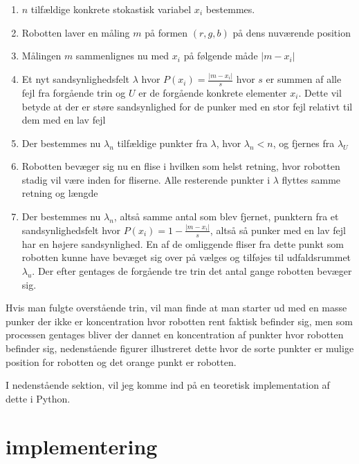 \documentclass[../../SRP.tex]{subfiles}
\begin{document}
\begin{enumerate}
  \item $n$ tilfældige konkrete stokastisk variabel $x_i$ bestemmes.

  \item Robotten laver en måling $m$ på formen $(r,g,b)$ på dens nuværende position

  \item Målingen $m$ sammenlignes nu med $x_i$ på følgende måde $|m - x_i|$

  \item Et nyt sandsynlighedsfelt $\lambda$ hvor $P(x_i) = \frac{|m - x_i|}{s}$ hvor $s$ er summen af alle fejl fra forgående trin og $U$ er de forgående konkrete elementer $x_i$. Dette vil betyde at der er støre sandsynlighed for de punker med en stor fejl relativt til dem med en lav fejl

  \item Der bestemmes nu $\lambda_n$ tilfældige punkter fra $\lambda$, hvor $ \lambda_n < n$, og fjernes fra $\lambda_U$

  \item Robotten bevæger sig nu en flise i hvilken som helst retning, hvor robotten stadig vil være inden for fliserne. Alle resterende punkter i $\lambda$ flyttes samme retning og længde 

  \item Der bestemmes nu $\lambda_n$, altså samme antal som blev fjernet, punktern fra et sandsynlighedsfelt hvor $P(x_i) = 1-\frac{|m-x_i|}{s}$, altså så punker med en lav fejl har en højere sandsynlighed. En af de omliggende fliser fra dette punkt som robotten kunne have bevæget sig over på vælges og tilføjes til udfaldsrummet $\lambda_u$. Der efter gentages de forgående tre trin det antal gange robotten bevæger sig.
\end{enumerate}
Hvis man fulgte overstående trin, vil man finde at man starter ud med en masse punker der ikke er koncentration hvor robotten rent faktisk befinder sig, men som processen gentages bliver der dannet en koncentration af punkter hvor robotten befinder sig, nedenstående figurer illustreret dette hvor de sorte punkter er mulige position for robotten og det orange punkt er robotten.
\begin{center}
\end{center}
I nedenstående sektion, vil jeg komme ind på en teoretisk implementation af dette i Python.

\section{implementering}
\end{document}
